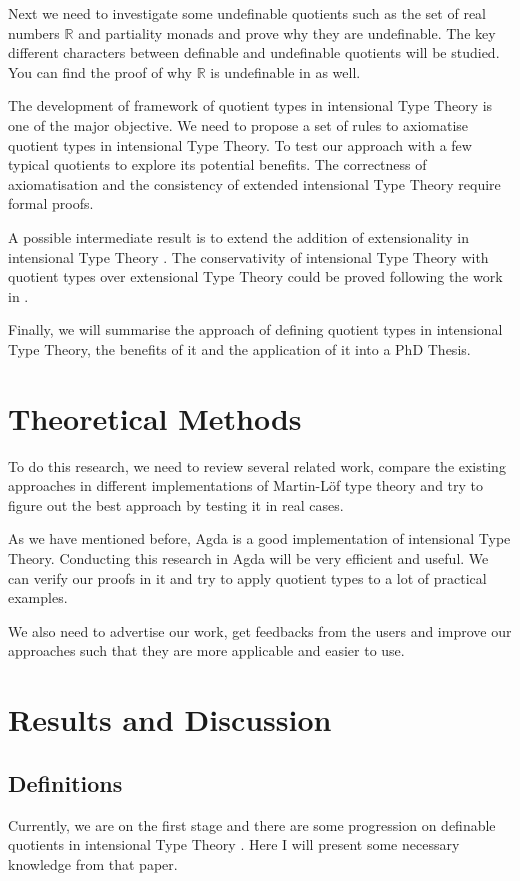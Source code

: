 \documentclass{article}
\theoremstyle{definition}
\newcommand{\R}{\mathbb{R}}
\newcommand{\itt}{intensional Type Theory}
\newcommand{\ett}{extensional Type Theory}
\newcommand{\mltt}{Martin-L\"{o}f type theory}
\begin{document}
Next we need to investigate some undefinable quotients such as the set
of real numbers $\R$ and partiality monads and prove why they are undefinable. The
key different characters between definable and undefinable quotients
will be studied. You can find the proof of why $\R$ is undefinable in
\cite{aan} as well.

The development of framework of quotient types in \itt{} is one of the major
objective. We need to propose a set of rules to axiomatise quotient
types in \itt{}. To test our approach with a few typical quotients
to explore its potential benefits. The correctness of axiomatisation
and the consistency of extended \itt{} require formal proofs.

A possible intermediate result is to extend the addition of extensionality in \itt{}
\cite{txa:99}. The conservativity of \itt{} with quotient types over
\ett{} could be proved following the work in \cite{hof:95}. 

Finally, we will summarise the approach of defining quotient types in
\itt{}, the benefits of it and the application of it into a PhD Thesis.


\section{Theoretical Methods}

To do this research, we need to review several related work, compare
the existing approaches in different implementations of \mltt{}
and try to figure out the best approach by testing it in real cases.

As we have mentioned before, Agda is a good implementation of
\itt{}. Conducting this research in Agda will be very efficient and
useful. We can verify our proofs in it and try to apply quotient types
to a lot of practical examples.

We also need to advertise our work, get feedbacks from the users and
improve our approaches such that they are more applicable and easier
to use.

\section{Results and Discussion}


\subsection{Definitions}

Currently, we are on the first stage and there are some progression on
definable quotients in \itt{} \cite{aan}. Here I will present some necessary knowledge from that paper.
\end{document}
